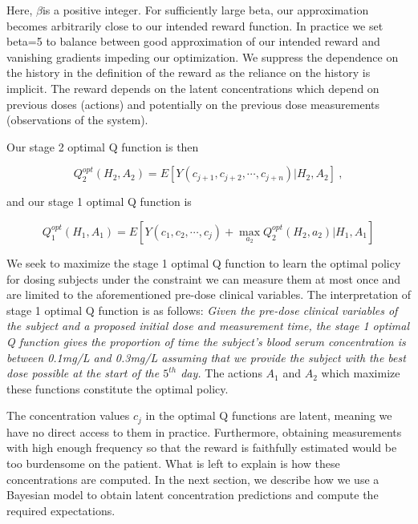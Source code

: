 \noindent Here, $ \beta $is a positive integer.  For sufficiently large beta, our approximation becomes arbitrarily close to our intended reward function.  In practice we set beta=5 to balance between good approximation of our intended reward and vanishing gradients impeding our optimization. We suppress the dependence on the history in the definition of the reward as the reliance on the history is implicit.  The reward depends on the latent concentrations which depend on previous doses (actions) and potentially on the previous dose measurements (observations of the system).

Our stage 2 optimal Q function is then

\begin{equation}
Q_{2}^{o p t}\left(H_{2}, A_{2}\right)=E\left[Y\left(c_{j+1}, c_{j+2}, \cdots, c_{j+n}\right) \Bigg\vert H_{2}, A_{2}\right] \>,
\end{equation}

\noindent and our stage 1 optimal Q function is

\begin{equation}
Q_{1}^{o p t}\left(H_{1}, A_{1}\right)= E \left[Y\left(c_{1}, c_{2}, \cdots, c_{j}\right)+\max _{a_{2}} Q_{2}^{o p t}\left(H_{2}, a_{2}\right) \Bigg\vert H_{1}, A_{1}\right]
\end{equation}

We seek to maximize the stage 1 optimal Q function to learn the optimal policy for dosing subjects under the constraint we can measure them at most once and are limited to the aforementioned pre-dose clinical variables.  The interpretation of stage 1 optimal Q function is as follows:\textit{ Given the pre-dose clinical variables of the subject and a proposed initial dose and measurement time, the stage 1 optimal Q function gives the proportion of time the subject’s blood serum concentration is between 0.1mg/L and 0.3mg/L assuming that we provide the subject with the best dose possible at the start of the $ 5^{th} $ day.}  The actions $ A_1 $ and $ A_2 $ which maximize these functions constitute the optimal policy.

The concentration values $ c_j $ in the optimal Q functions are latent, meaning we have no direct access to them in practice. Furthermore, obtaining measurements with high enough frequency so that the reward is faithfully estimated would be too burdensome on the patient. What is left to explain is how these concentrations are computed. In the next section, we describe how we use a Bayesian model  to obtain latent concentration predictions and compute the required expectations.
